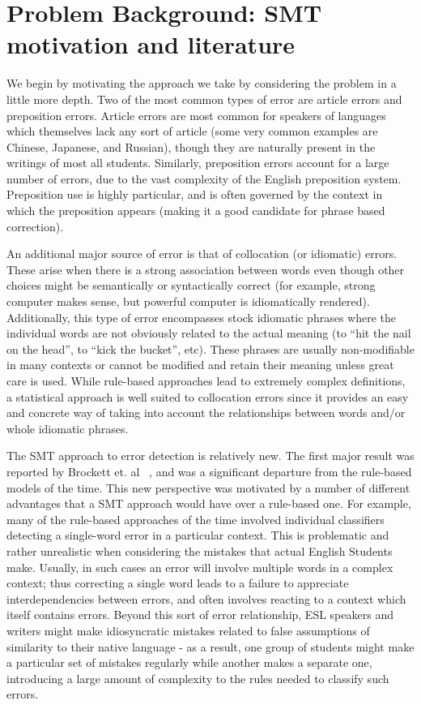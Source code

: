 \documentclass[11pt,letterpaper]{article}
\begin{document}
\section{Problem Background: SMT motivation and literature}
\indent We begin by motivating the approach we take by considering the problem in a little more depth. Two of the 
most common types of error are article errors and preposition errors. Article errors are most common for speakers of languages which themselves lack any sort of article (some very common examples are Chinese, Japanese, and Russian), though they are naturally present in the writings of most all students. Similarly, preposition errors account for a large number of errors, due to the vast complexity of the English preposition system. Preposition use is highly particular, and is often governed by the context in which the preposition appears (making it a good candidate for 
phrase based correction). \newline

\indent An additional major source of error is that of collocation (or idiomatic) errors. These arise when there is a strong association between words even though other choices might be semantically or syntactically correct (for example, strong computer makes sense, but powerful computer is idiomatically rendered). Additionally, this type of error encompasses stock idiomatic phrases where the individual words are not obviously related to the actual meaning (to “hit the nail on the head”, to “kick the bucket”, etc). 
These phrases are usually non-modifiable in many contexts or cannot be modified and retain their meaning unless great care is used. While rule-based approaches lead to extremely complex definitions, a statistical approach is well suited to collocation errors since it provides an easy and concrete way 
of taking into account the relationships between words and/or whole idiomatic phrases. \newline

\indent The SMT approach to error detection is relatively new. The first major result was reported by Brockett et. al ~\cite{phrasal}, and was a significant departure from the rule-based models of the time. This new perspective was motivated by a number of different advantages that a SMT approach would have over a rule-based one. For example, many of the rule-based approaches of the time involved individual classifiers detecting a single-word error in a particular context. This is problematic and rather unrealistic when considering the mistakes that actual English Students make. Usually, in such cases an error will involve multiple words in a complex context; thus correcting a single word leads to a failure to appreciate interdependencies between errors, and often involves reacting to a context which itself contains errors. Beyond this sort of error relationship, ESL speakers and writers might make idiosyncratic mistakes related to false assumptions of similarity to their native language - as a result, one group of students might make a particular set of mistakes regularly while another makes a separate one, introducing a large amount of complexity to the rules needed to classify such errors. \newline
\end{document}
